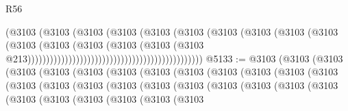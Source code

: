 \begin{lexlean}{R56}
\begin{coremodule}
{{{{{{{{{{{{{{{{{{{{{{{{{{{{{{{{{{{{{{{{{{{{{{{{{{{{{{{{{{{{{{{{{{{{{{{{{{{{{{{{{{{{{{{{{{{{{{{{{{{{{{{{{{{{{{{{{{{{{{{{{{{{{{{{{{{{{{{{{{{{{{{{{{{{{{{{{{{{{{{{{{{{{{{{{{{{{{{{{{{{{{{{{{{{{{{{{{{{{{{{{{{{{{{{{{{                                                                  (@3103
                                                                    (@3103
                                                                      (@3103
                                                                        (@3103
                                                                          (@3103
                                                                            (@3103
                                                                              (@3103
                                                                                (@3103
                                                                                  (@3103
                                                                                    (@3103
                                                                                      (@3103
                                                                                        (@3103
                                                                                          (@3103
                                                                                            (@3103
                                                                                              (@3103
                                                                                                (@3103
                                                                                                  @213)))))))))))))))))))))))))))))))))))))))))))))))
@5133 := @3103
    (@3103
      (@3103
        (@3103
          (@3103
            (@3103
              (@3103
                (@3103
                  (@3103
                    (@3103
                      (@3103
                        (@3103
                          (@3103
                            (@3103
                              (@3103
                                (@3103
                                  (@3103
                                    (@3103
                                      (@3103
                                        (@3103
                                          (@3103
                                            (@3103
                                              (@3103
                                                (@3103
                                                  (@3103
                                                    (@3103
                                                      (@3103
                                                        (@3103
                                                          (@3103
}}}}}}}}}}}}}}}}}}}}}}}}}}}}}}}}}}}}}}}}}}}}}}}}}}}}}}}}}}}}}}}}}}}}}}}}}}}}}}}}}}}}}}}}}}}}}}}}}}}}}}}}}}}}}}}}}}}}}}}}}}}}}}}}}}}}}}}}}}}}}}}}}}}}}}}}}}}}}}}}}}}}}}}}}}}}}}}}}}}}}}}}}}}}}}}}}}}}}}}}}}}}}}}}}}}
\end{coremodule}
\end{lexlean}
